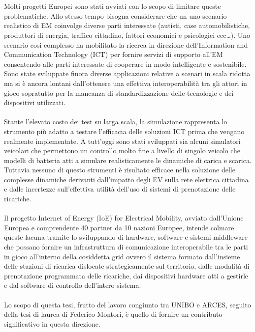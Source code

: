 \\\\
Molti progetti Europei sono stati avviati con lo scopo di limitare queste problematiche. Allo stesso tempo bisogna considerare che un uno scenario realistico di EM coinvolge diverse parti interessate (autisti, case automobilistiche, produttori di energia, traffico cittadino, fattori economici e psicologici ecc\dots). Uno scenario cosi complesso ha mobilitato la ricerca in direzione dell'Information and Communication Technology (ICT) per fornire servizi di supporto all'EM consentendo alle parti interessate di cooperare in modo intelligente e sostenibile.
Sono state sviluppate finora diverse applicazioni relative a scenari in scala ridotta ma si è ancora lontani dall'ottenere una effettiva interoperabilità tra gli attori in gioco sopratutto per la mancanza di standardizzazione delle tecnologie e dei dispositivi utilizzati.
\\\\
Stante l'elevato costo dei test su larga scala, la simulazione rappresenta lo strumento più adatto a testare l'efficacia delle soluzioni ICT prima che vengano realmente implementate. A tutt'oggi sono stati sviluppati sia alcuni simulatori veicolari che permettono un controllo molto fine a livello di singolo veicolo che modelli di batteria atti a simulare realisticamente le dinamiche di carica e scarica. Tuttavia nessuno di questo strumenti è risultato efficace nella soluzione delle complesse dinamiche derivanti dall'impatto degli EV sulla rete elettrica cittadina e dalle incertezze sull'effettiva utilità dell'uso di sistemi di prenotazione delle ricariche. 
\\\\
Il progetto Internet of Energy (IoE) for Electrical Mobility, avviato dall'Unione Europea e comprendente 40 partner da 10 nazioni Europee, intende colmare queste lacuna tramite lo sviluppando di hardware, software e sistemi middleware che possano fornire un infrastruttura di comunicazione interoperabile tra le parti in gioco all'interno della cosiddetta grid ovvero il sistema formato dall'insieme delle stazioni di ricarica dislocate strategicamente sul territorio, dalle modalità di prenotazione programmata delle ricariche, dai dispositivi hardware atti a gestirle e dal software di controllo dell'intero sistema.
\\\\
Lo scopo di questa tesi, frutto del lavoro congiunto tra UNIBO e ARCES, seguito della tesi di laurea di Federico Montori, è quello di fornire un contributo significativo in questa direzione.

